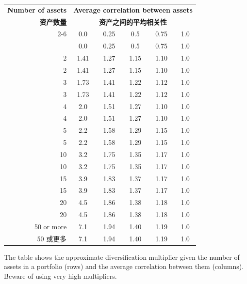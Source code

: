 \begin{bilingualtableblock}  \begingroup \small \centering \begin{tabular}{@{} rccccc@{}}
\toprule
\textbf{Number of assets} & \multicolumn{5}{c}{\textbf{Average correlation between assets}} \\
\textbf{资产数量} & \multicolumn{5}{c}{\textbf{资产之间的平均相关性}} \\
\cmidrule(l){2-6}
& 0.0 & 0.25 & 0.5 & 0.75 & 1.0 \\
& 0.0 & 0.25 & 0.5 & 0.75 & 1.0 \\
\midrule
2 & 1.41 & 1.27 & 1.15 & 1.10 & 1.0 \\
2 & 1.41 & 1.27 & 1.15 & 1.10 & 1.0 \\
3 & 1.73 & 1.41 & 1.22 & 1.12 & 1.0 \\
3 & 1.73 & 1.41 & 1.22 & 1.12 & 1.0 \\
4 & 2.0 & 1.51 & 1.27 & 1.10 & 1.0 \\
4 & 2.0 & 1.51 & 1.27 & 1.10 & 1.0 \\
5 & 2.2 & 1.58 & 1.29 & 1.15 & 1.0 \\
5 & 2.2 & 1.58 & 1.29 & 1.15 & 1.0 \\
10 & 3.2 & 1.75 & 1.35 & 1.17 & 1.0 \\
10 & 3.2 & 1.75 & 1.35 & 1.17 & 1.0 \\
15 & 3.9 & 1.83 & 1.37 & 1.17 & 1.0 \\
15 & 3.9 & 1.83 & 1.37 & 1.17 & 1.0 \\
20 & 4.5 & 1.86 & 1.38 & 1.18 & 1.0 \\
20 & 4.5 & 1.86 & 1.38 & 1.18 & 1.0 \\
50 or more & 7.1 & 1.94 & 1.40 & 1.19 & 1.0 \\
50 或更多 & 7.1 & 1.94 & 1.40 & 1.19 & 1.0 \\
\bottomrule
\end{tabular}
\par \endgroup \end{bilingualtableblock}

\begin{englishblock} The table shows the approximate diversification multiplier given the number of assets in a portfolio (rows) and the average correlation between them (columns). Beware of using very high multipliers. \end{englishblock}

